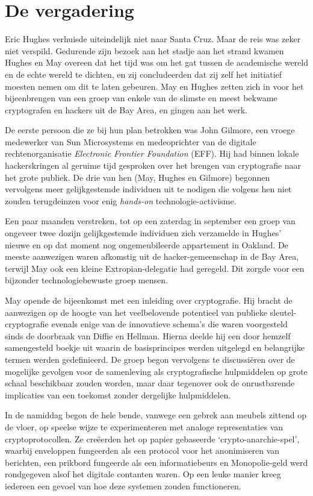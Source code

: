 \documentclass[
  a5paper,
  smalldemyvopaper,11pt,twoside,onecolumn,openright,extrafontsizes]{memoir}
\begin{document}
\section{De vergadering}\label{de-vergadering}

Eric Hughes verhuisde uiteindelijk niet naar Santa Cruz. Maar de reis
was zeker niet verspild. Gedurende zijn bezoek aan het stadje aan het
strand kwamen Hughes en May overeen dat het tijd was om het gat tussen
de academische wereld en de echte wereld te dichten, en zij
concludeerden dat zij zelf het initiatief moesten nemen om dit te laten
gebeuren. May en Hughes zetten zich in voor het bijeenbrengen van een
groep van enkele van de slimste en meest bekwame cryptografen en hackers
uit de Bay Area, en gingen aan het werk.

De eerste persoon die ze bij hun plan betrokken was John Gilmore, een
vroege medewerker van Sun Microsystems en medeoprichter van de digitale
rechtenorganisatie \emph{Electronic Frontier Foundation} (EFF). Hij had
binnen lokale hackerskringen al geruime tijd gesproken over het brengen
van cryptografie naar het grote publiek. De drie van hen (May, Hughes en
Gilmore) begonnen vervolgens meer gelijkgestemde individuen uit te
nodigen die volgens hen niet zouden terugdeinzen voor enig
\emph{hands-on} technologie-activisme.

Een paar maanden verstreken, tot op een zaterdag in september een groep
van ongeveer twee dozijn gelijkgestemde individuen zich verzamelde in
Hughes' nieuwe en op dat moment nog ongemeubileerde appartement in
Oakland. De meeste aanwezigen waren afkomstig uit de hacker-gemeenschap
in de Bay Area, terwijl May ook een kleine Extropian-delegatie had
geregeld. Dit zorgde voor een bijzonder technologiebewuste groep mensen.

May opende de bijeenkomst met een inleiding over cryptografie. Hij
bracht de aanwezigen op de hoogte van het veelbelovende potentieel van
publieke sleutel-cryptografie evenals enige van de innovatieve schema's
die waren voorgesteld sinds de doorbraak van Diffie en Hellman. Hierna
deelde hij een door hemzelf samengesteld boekje uit waarin de
basisprincipes werden uitgelegd en belangrijke termen werden
gedefinieerd. De groep begon vervolgens te discussiëren over de
mogelijke gevolgen voor de samenleving als cryptografische hulpmiddelen
op grote schaal beschikbaar zouden worden, maar daar tegenover ook de
onrustbarende implicaties van een toekomst zonder dergelijke
hulpmiddelen.

In de namiddag begon de hele bende, vanwege een gebrek aan meubels
zittend op de vloer, op speelse wijze te experimenteren met analoge
representaties van cryptoprotocollen. Ze creëerden het op papier
gebaseerde `crypto-anarchie-spel', waarbij enveloppen fungeerden als een
protocol voor het anonimiseren van berichten, een prikbord fungeerde als
een informatiebeurs en Monopolie-geld werd rondgegeven alsof het
digitale contanten waren. Op een leuke manier kreeg iedereen een gevoel
van hoe deze systemen zouden functioneren.
\end{document}
